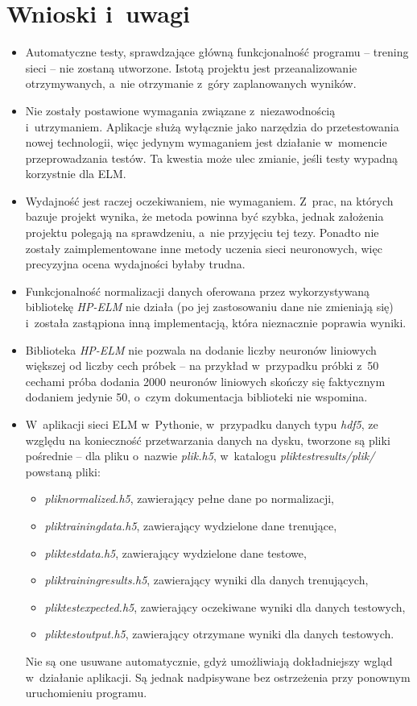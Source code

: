 \documentclass[pl]{minipw} %
\begin{document}
\section{Wnioski i~uwagi}
\begin{itemize}
\item Automatyczne testy, sprawdzające główną funkcjonalność programu -- trening sieci -- nie zostaną utworzone. Istotą projektu jest przeanalizowanie otrzymywanych, a~nie otrzymanie z~góry zaplanowanych wyników.
\item Nie zostały postawione wymagania związane z~niezawodnością i~utrzymaniem. Aplikacje służą wyłącznie jako narzędzia do przetestowania nowej technologii, więc jedynym wymaganiem jest działanie w~momencie przeprowadzania testów. Ta kwestia może ulec zmianie, jeśli testy wypadną korzystnie dla ELM.
\item Wydajność jest raczej oczekiwaniem, nie wymaganiem. Z~prac, na których bazuje projekt wynika, że metoda powinna być szybka, jednak założenia projektu polegają na sprawdzeniu, a~nie przyjęciu tej tezy. Ponadto nie zostały zaimplementowane inne metody uczenia sieci neuronowych, więc precyzyjna ocena wydajności byłaby trudna.
\item Funkcjonalność normalizacji danych oferowana przez wykorzystywaną bibliotekę \textit{HP-ELM} nie działa (po jej zastosowaniu dane nie zmieniają się) i~została zastąpiona inną implementacją, która nieznacznie poprawia wyniki.
\item Biblioteka \textit{HP-ELM} nie pozwala na dodanie liczby neuronów liniowych większej od liczby cech próbek -- na przykład w~przypadku próbki z~50 cechami próba dodania 2000 neuronów liniowych skończy się faktycznym dodaniem jedynie 50, o~czym dokumentacja biblioteki nie wspomina.
\item W~aplikacji sieci ELM w~Pythonie, w~przypadku danych typu \textit{hdf5}, ze względu na konieczność przetwarzania danych na dysku, tworzone są pliki pośrednie -- dla pliku o~nazwie \textit{plik.h5}, w~katalogu \textit{plik\textunderscore test\textunderscore results/plik/} powstaną pliki:
\begin{itemize}
\item \textit{plik\textunderscore normalized.h5}, zawierający pełne dane po normalizacji, 
\item \textit{plik\textunderscore training\textunderscore data.h5}, zawierający wydzielone dane trenujące, 
\item \textit{plik\textunderscore test\textunderscore data.h5}, zawierający wydzielone dane testowe,
\item \textit{plik\textunderscore training\textunderscore results.h5}, zawierający wyniki dla danych trenujących,
\item \textit{plik\textunderscore test\textunderscore expected.h5}, zawierający oczekiwane wyniki dla danych testowych,
\item \textit{plik\textunderscore test\textunderscore output.h5}, zawierający otrzymane wyniki dla danych testowych.
\end{itemize} 
Nie są one usuwane automatycznie, gdyż umożliwiają dokładniejszy wgląd w~działanie aplikacji. Są jednak nadpisywane bez ostrzeżenia przy ponownym uruchomieniu programu.
\end{itemize}
\clearpage
\end{document}

